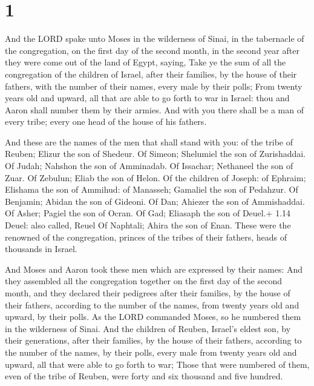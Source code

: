\hypertarget{section}{%
\section{1}\label{section}}

 And the LORD spake unto Moses in the wilderness of Sinai,
in the tabernacle of the congregation, on the first day of the second
month, in the second year after they were come out of the land of Egypt,
saying,  Take ye the sum of all the congregation of the
children of Israel, after their families, by the house of their fathers,
with the number of their names, every male by their polls; 
From twenty years old and upward, all that are able to go forth to war
in Israel: thou and Aaron shall number them by their armies.
 And with you there shall be a man of every tribe; every one
head of the house of his fathers.

 And these are the names of the men that shall stand with
you: of the tribe of Reuben; Elizur the son of Shedeur.  Of
Simeon; Shelumiel the son of Zurishaddai.  Of Judah; Nahshon
the son of Amminadab.  Of Issachar; Nethaneel the son of
Zuar.  Of Zebulun; Eliab the son of Helon.  Of
the children of Joseph: of Ephraim; Elishama the son of Ammihud: of
Manasseh; Gamaliel the son of Pedahzur.  Of Benjamin;
Abidan the son of Gideoni.  Of Dan; Ahiezer the son of
Ammishaddai.  Of Asher; Pagiel the son of Ocran.
 Of Gad; Eliasaph the son of Deuel.+ 1.14 Deuel: also
called, Reuel  Of Naphtali; Ahira the son of Enan.
 These were the renowned of the congregation, princes of
the tribes of their fathers, heads of thousands in Israel.

 And Moses and Aaron took these men which are expressed
by their names:  And they assembled all the congregation
together on the first day of the second month, and they declared their
pedigrees after their families, by the house of their fathers, according
to the number of the names, from twenty years old and upward, by their
polls.  As the LORD commanded Moses, so he numbered them in
the wilderness of Sinai.  And the children of Reuben,
Israel's eldest son, by their generations, after their families, by the
house of their fathers, according to the number of the names, by their
polls, every male from twenty years old and upward, all that were able
to go forth to war;  Those that were numbered of them, even
of the tribe of Reuben, were forty and six thousand and five hundred.


